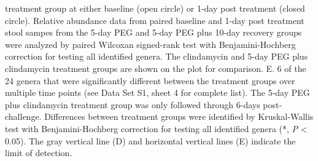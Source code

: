 \documentclass[
  11pt,
]{article}
\begin{document}
treatment group at either baseline (open circle) or 1-day post treatment
(closed circle). Relative abundance data from paired baseline and 1-day
post treatment stool sampes from the 5-day PEG and 5-day PEG plus 10-day
recovery groups were analyzed by paired Wilcoxan signed-rank test with
Benjamini-Hochberg correction for testing all identified genera. The
clindamycin and 5-day PEG plus clindamycin treatment groups are shown on
the plot for comparison. E. 6 of the 24 genera that were significantly
different between the treatment groups over multiple time points (see
Data Set S1, sheet 4 for complete list). The 5-day PEG plus clindamycin
treatment group was only followed through 6-days post-challenge.
Differences between treatment groups were identified by Kruskal-Wallis
test with Benjamini-Hochberg correction for testing all identified
genera (*, \emph{P} \textless{} 0.05). The gray vertical line (D) and
horizontal vertical lines (E) indicate the limit of detection. \newpage
\end{document}
